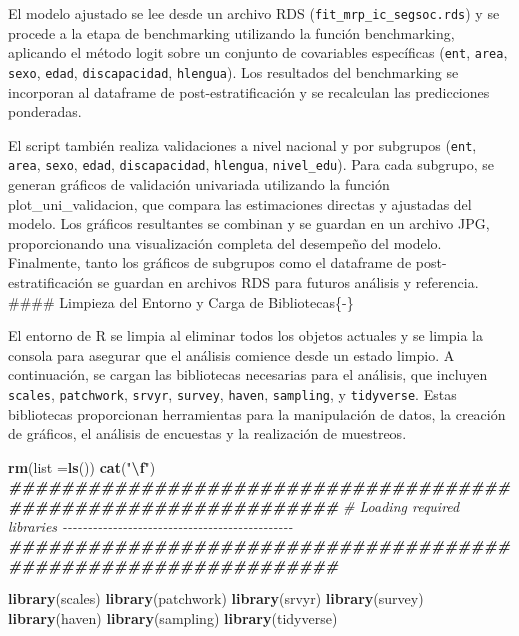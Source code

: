 \documentclass[
  12pt,
]{book}
\newenvironment{Shaded}{\begin{snugshade}}{\end{snugshade}}
\newcommand{\AttributeTok}[1]{\textcolor[rgb]{0.13,0.29,0.53}{#1}}
\newcommand{\CommentTok}[1]{\textcolor[rgb]{0.56,0.35,0.01}{\textit{#1}}}
\newcommand{\DocumentationTok}[1]{\textcolor[rgb]{0.56,0.35,0.01}{\textbf{\textit{#1}}}}
\newcommand{\FunctionTok}[1]{\textcolor[rgb]{0.13,0.29,0.53}{\textbf{#1}}}
\newcommand{\NormalTok}[1]{#1}
\newcommand{\SpecialCharTok}[1]{\textcolor[rgb]{0.81,0.36,0.00}{\textbf{#1}}}
\newcommand{\StringTok}[1]{\textcolor[rgb]{0.31,0.60,0.02}{#1}}
\begin{document}
El modelo ajustado se lee desde un archivo RDS (\texttt{fit\_mrp\_ic\_segsoc.rds}) y se procede a la etapa de benchmarking utilizando la función benchmarking, aplicando el método logit sobre un conjunto de covariables específicas (\texttt{ent}, \texttt{area}, \texttt{sexo}, \texttt{edad}, \texttt{discapacidad}, \texttt{hlengua}). Los resultados del benchmarking se incorporan al dataframe de post-estratificación y se recalculan las predicciones ponderadas.

El script también realiza validaciones a nivel nacional y por subgrupos (\texttt{ent}, \texttt{area}, \texttt{sexo}, \texttt{edad}, \texttt{discapacidad}, \texttt{hlengua}, \texttt{nivel\_edu}). Para cada subgrupo, se generan gráficos de validación univariada utilizando la función plot\_uni\_validacion, que compara las estimaciones directas y ajustadas del modelo. Los gráficos resultantes se combinan y se guardan en un archivo JPG, proporcionando una visualización completa del desempeño del modelo. Finalmente, tanto los gráficos de subgrupos como el dataframe de post-estratificación se guardan en archivos RDS para futuros análisis y referencia.
\#\#\#\# Limpieza del Entorno y Carga de Bibliotecas\{-\}

El entorno de R se limpia al eliminar todos los objetos actuales y se limpia la consola para asegurar que el análisis comience desde un estado limpio. A continuación, se cargan las bibliotecas necesarias para el análisis, que incluyen \texttt{scales}, \texttt{patchwork}, \texttt{srvyr}, \texttt{survey}, \texttt{haven}, \texttt{sampling}, y \texttt{tidyverse}. Estas bibliotecas proporcionan herramientas para la manipulación de datos, la creación de gráficos, el análisis de encuestas y la realización de muestreos.

\begin{Shaded}
\begin{Highlighting}[]
\FunctionTok{rm}\NormalTok{(}\AttributeTok{list =}\FunctionTok{ls}\NormalTok{())}
\FunctionTok{cat}\NormalTok{(}\StringTok{"}\SpecialCharTok{\textbackslash{}f}\StringTok{"}\NormalTok{)}
\DocumentationTok{\#\#\#\#\#\#\#\#\#\#\#\#\#\#\#\#\#\#\#\#\#\#\#\#\#\#\#\#\#\#\#\#\#\#\#\#\#\#\#\#\#\#\#\#\#\#\#\#\#\#\#\#\#\#\#\#\#\#\#\#\#\#\#}
\CommentTok{\# Loading required libraries {-}{-}{-}{-}{-}{-}{-}{-}{-}{-}{-}{-}{-}{-}{-}{-}{-}{-}{-}{-}{-}{-}{-}{-}{-}{-}{-}{-}{-}{-}{-}{-}{-}{-}{-}{-}{-}{-}{-}{-}{-}{-}{-}{-}{-}{-}}
\DocumentationTok{\#\#\#\#\#\#\#\#\#\#\#\#\#\#\#\#\#\#\#\#\#\#\#\#\#\#\#\#\#\#\#\#\#\#\#\#\#\#\#\#\#\#\#\#\#\#\#\#\#\#\#\#\#\#\#\#\#\#\#\#\#\#\#}

\FunctionTok{library}\NormalTok{(scales)}
\FunctionTok{library}\NormalTok{(patchwork)}
\FunctionTok{library}\NormalTok{(srvyr)}
\FunctionTok{library}\NormalTok{(survey)}
\FunctionTok{library}\NormalTok{(haven)}
\FunctionTok{library}\NormalTok{(sampling)}
\FunctionTok{library}\NormalTok{(tidyverse)}
\end{Highlighting}
\end{Shaded}
\end{document}
